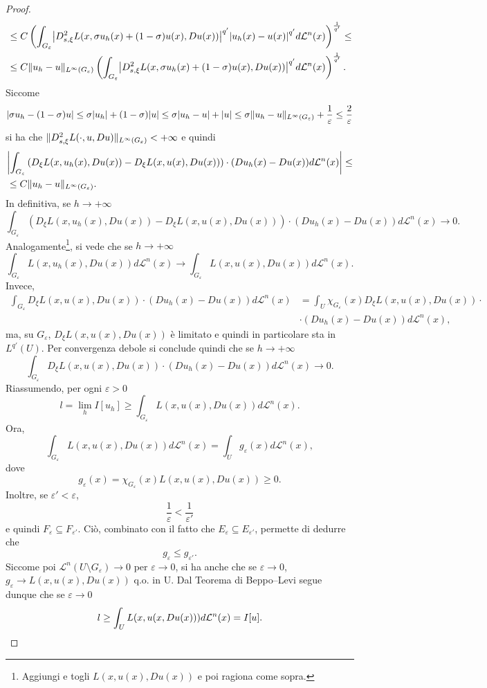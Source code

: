 \begin{proof}
\begin{align*}
		&\le C \left( \int_{G_\varepsilon}\abs*{D^2_{s,\xi}L(x,\sigma u_h(x) +(1-\sigma)u(x),Du(x))}^{q'}\abs*{u_h(x)-u(x)}^{q'}d\mathcal{L}^n(x)\right) ^{\frac{1}{q'}} \le \\
		&\le C \norm{u_h-u}_{L^\infty(G_\varepsilon)}\left( \int_{G_\varepsilon}\abs*{D^2_{s,\xi}L(x,\sigma u_h(x) +(1-\sigma)u(x),Du(x))}^{q'}d\mathcal{L}^n(x)\right) ^{\frac{1}{q'}}.
	\end{align*}
	Siccome
	\[ \lvert\sigma u_h - (1-\sigma)u\rvert \le \sigma \lvert u_h\rvert + (1-\sigma)\lvert u\rvert \le \sigma \lvert u_h - u\rvert + \lvert u\rvert \le \sigma \lVert u_h-u\rVert_{L^\infty(G_\varepsilon)} + \frac{1}{\varepsilon} \le \frac{2}{\varepsilon}\]
	si ha che $\lVert D^2_{s,\xi}L(\cdot,u,Du)\rVert_{L^\infty(G_\varepsilon)} < +\infty$ e quindi 
	\begin{align*}
		&\abs*{\int_{G_\varepsilon}\left( D_\xi L(x,u_h(x),Du(x))-D_\xi L(x,u(x),Du(x))\right) \cdot (Du_h(x) - Du(x))d\mathcal{L}^n(x)} \le \\
		& \le C \norm{u_h-u}_{L^\infty(G_\varepsilon)}.
	\end{align*}
	In definitiva, se $h \to +\infty$
	\[ \int_{G_\varepsilon}\left( D_\xi L(x,u_h(x),Du(x))-D_\xi L(x,u(x),Du(x))\right) \cdot (Du_h(x) - Du(x))d\mathcal{L}^n(x) \to 0. \]
	Analogamente\footnote{Aggiungi e togli $L(x,u(x),Du(x))$ e poi ragiona come sopra.}, si vede che se $h \to +\infty$
	\[  \int_{G_\varepsilon} L(x,u_h(x),Du(x))d\mathcal{L}^n(x) \to  \int_{G_\varepsilon} L(x,u(x),Du(x))d\mathcal{L}^n(x). \]
	Invece, 
	\begin{align*}
		\int_{G_\varepsilon}D_\xi L(x,u(x),Du(x))\cdot (Du_h(x) - Du(x))d\mathcal{L}^n(x)  &= \int_{U} \chi_{G_\varepsilon}(x)D_\xi L(x,u(x),Du(x))\cdot \\
		&\cdot (Du_h(x) - Du(x))d\mathcal{L}^n(x), 
	\end{align*}
	ma, su $G_\varepsilon$, $D_\xi L(x,u(x),Du(x))$ è limitato e quindi in particolare sta in $L^{q'}(U)$. Per convergenza debole si conclude quindi che se $h \to +\infty$
	\[ \int_{G_\varepsilon}D_\xi L(x,u(x),Du(x))\cdot (Du_h(x) - Du(x))d\mathcal{L}^n(x)  \to 0. \]
	Riassumendo, per ogni $\varepsilon > 0$
	\[ l = \lim\limits_{h} I[u_h] \ge \int_{G_\varepsilon} L(x,u(x),Du(x))d\mathcal{L}^n(x). \]
	Ora, 
	\[ \int_{G_\varepsilon} L(x,u(x),Du(x))d\mathcal{L}^n(x) = \int_{U}g_\varepsilon(x) d\mathcal{L}^n(x), \]
	dove 
	\[ g_\varepsilon(x) = \chi_{G_\varepsilon}(x) L(x,u(x),Du(x)) \ge 0. \]
	Inoltre, se $\varepsilon' < \varepsilon$, 
	\[ \frac{1}{\varepsilon} < \frac{1}{\varepsilon'} \]
	e quindi $F_\varepsilon \subseteq F_{\varepsilon'}$. Ciò, combinato con il fatto che $E_\varepsilon \subseteq E_{\varepsilon'}$, permette di dedurre che 
	\[ g_\varepsilon \le  g_{\varepsilon'}.\]
	Siccome poi $\mathcal{L}^n(U\setminus G_\varepsilon) \to 0$ per $\varepsilon \to 0$, si ha anche che se $\varepsilon \to 0$, $g_\varepsilon \to L(x,u(x),Du(x))$ q.o. in U. Dal Teorema di Beppo--Levi segue dunque che se $\varepsilon \to 0$
	\[  l \ge \int_U L(x,u(x,Du(x)))d\mathcal{L}^n(x) = I[u].\qedhere\]
\end{proof}
